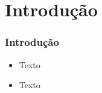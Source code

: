 \section{Introdução}
\begin{frame}
\frametitle{Introdução}
\justifying

\begin{itemize}
    \item  Texto
    \vspace{0.2cm}

    \item Texto
    \vspace{0.2cm}

\end{itemize}    
\end{frame}